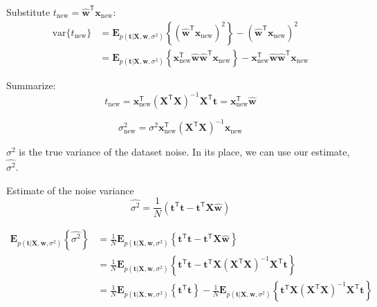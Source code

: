 \documentclass[a4paper,11pt]{article} %
\begin{document}
Substitute $t_{\mathrm{new}} = \widehat{\mathbf{w}}^{\mathsf{T}}\mathbf{x}_{\mathrm{new}}$:
\begin{align*}
\mathrm{var}\{t_{\mathrm{new}}\} & =
\mathbf{E}_{p(\mathbf{t}|\mathbf{X},\mathbf{w},\sigma^2)}\left\{
\left(\widehat{\mathbf{w}}^{\mathsf{T}}\mathbf{x}_{\mathrm{new}}\right)^2
\right\} - \left(\widehat{\mathbf{w}}^{\mathsf{T}}\mathbf{x}_{\mathrm{new}}\right)^2 \\
& = \mathbf{E}_{p(\mathbf{t}|\mathbf{X},\mathbf{w},\sigma^2)}\left\{
\mathbf{x}_{\mathrm{new}}^{\mathsf{T}} \widehat{\mathbf{w}}
\widehat{\mathbf{w}}^{\mathsf{T}} \mathbf{x}_{\mathrm{new}}
\right\} - \mathbf{x}_{\mathrm{new}}^{\mathsf{T}} \widehat{\mathbf{w}}
\widehat{\mathbf{w}}^{\mathsf{T}} \mathbf{x}_{\mathrm{new}}
\end{align*}

Summarize:
\begin{equation}
t_{\mathrm{new}} = \mathbf{x}_{\mathrm{new}}^{\mathsf{T}}
(\mathbf{X}^{\mathsf{T}}\mathbf{X})^{-1}
\mathbf{X}^{\mathsf{T}}\mathbf{t} = 
\mathbf{x}_{\mathrm{new}}^{\mathsf{T}} \widehat{\mathbf{w}}
\end{equation}

\begin{equation}
\sigma^2_{\mathrm{new}} = \sigma^{2} \mathbf{x}^{\mathsf{T}}_{\mathrm{new}}
(\mathbf{X}^{\mathsf{T}}\mathbf{X})^{-1} \mathbf{x}_{\mathrm{new}}
\end{equation}

$\sigma^2$ is the true variance of the dataset noise. In its place, we can use our
estimate, $\widehat{\sigma^2}$.

Estimate of the noise variance
\begin{equation}
\widehat{\sigma^2} = \frac{1}{N}
\left( \mathbf{t}^{\mathsf{T}}\mathbf{t} - 
\mathbf{t}^{\mathsf{T}}\mathbf{X}\widehat{\mathbf{w}}
\right)
\end{equation}


\begin{align*}
\mathbf{E}_{p(\mathbf{t}|\mathbf{X},\mathbf{w},\sigma^2)}
\left\{\widehat{\sigma^2}\right\} & =
\frac{1}{N} \mathbf{E}_{p(\mathbf{t}|\mathbf{X},\mathbf{w},\sigma^2)}
\left\{
\mathbf{t}^{\mathsf{T}}\mathbf{t} - 
\mathbf{t}^{\mathsf{T}}\mathbf{X}\widehat{\mathbf{w}}
\right\} \\
& = \frac{1}{N}\mathbf{E}_{p(\mathbf{t}|\mathbf{X},\mathbf{w},\sigma^2)}
\left\{
\mathbf{t}^{\mathsf{T}}\mathbf{t} - 
\mathbf{t}^{\mathsf{T}}\mathbf{X} (\mathbf{X}^{\mathsf{T}}\mathbf{X})^{-1}
\mathbf{X}^{\mathsf{T}}\mathbf{t}
\right\} \\
& = \frac{1}{N}\mathbf{E}_{p(\mathbf{t}|\mathbf{X},\mathbf{w},\sigma^2)}
\left\{ \mathbf{t}^{\mathsf{T}}\mathbf{t} \right\} -
\frac{1}{N}\mathbf{E}_{p(\mathbf{t}|\mathbf{X},\mathbf{w},\sigma^2)}
\left\{
\mathbf{t}^{\mathsf{T}}\mathbf{X} (\mathbf{X}^{\mathsf{T}}\mathbf{X})^{-1}
\mathbf{X}^{\mathsf{T}}\mathbf{t}
\right\}
\end{align*}
\end{document}
